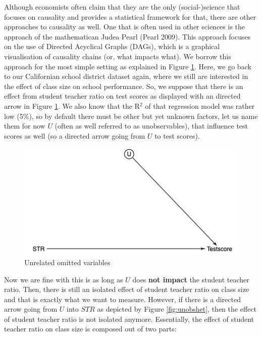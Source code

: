 \documentclass[
]{book}
\begin{document}
Although economists often claim that they are the only (social-)science that focuses on causality and provides a statistical framework for that, there are other approaches to causality as well. One that is often used in other sciences is the approach of the mathematican Judea Pearl (Pearl 2009). This approach focuses on the use of Directed Acyclical Graphs (DAGs), which is a graphical visualisation of causality chains (or, what impacts what). We borrow this approach for the most simple setting as explained in Figure \ref{fig:unknown}. Here, we go back to our Californian school district dataset again, where we still are interested in the effect of class size on school performance. So, we suppose that there is an effect from student teacher ratio on test scores as displayed with an directed arrow in Figure \ref{fig:unknown}. We also know that the R\(^2\) of that regression model was rather low (5\%), so by default there must be other but yet unknown factors, let us name them for now \(U\) (often as well referred to as unobservables), that influence test scores as well (so a directed arrow going from \(U\) to test scores).

\begin{figure}

{\centering \includegraphics[width=600px]{./figures/unknown} 

}

\caption{Unrelated omitted variables}\label{fig:unknown}
\end{figure}

Now we are fine with this is as long as \(U\) does \textbf{not impact} the student teacher ratio. Then, there is still an isolated effect of student teacher ratio on class size and that is exactly what we want to measure. However, if there is a directed arrow going from \(U\) into \(STR\) as depicted by Figure \ref{fig:unobshet}, then the effect of student teacher ratio is not isolated anymore. Essentially, the effect of student teacher ratio on class size is composed out of two parts:
\end{document}

